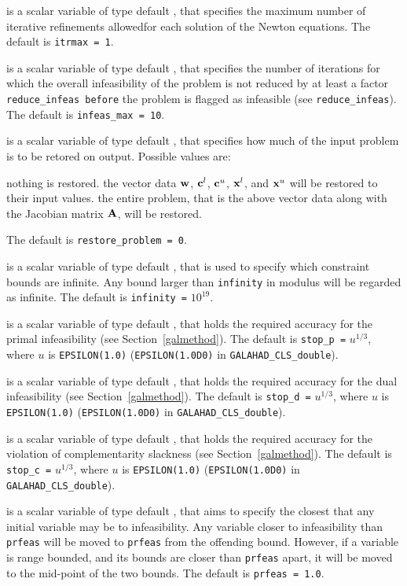 \documentclass{galahad}
\newcommand{\libraryname}{GALAHAD}
\newcommand{\packagename}{CLS}
\newcommand{\fullpackagename}{\libraryname\_\packagename}
\begin{document}
\begin{description}
 is a scalar variable of type default \integer, that specifies
the maximum number of iterative refinements allowedfor each solution of
the Newton equations.
The default is {\tt itrmax = 1}.

 is a scalar variable of type default \integer, that specifies
the number of iterations for which the overall infeasibility
of the problem is not reduced by at least a factor {\tt reduce\_infeas
before} the problem is flagged as infeasible (see {\tt reduce\_infeas}).
The default is {\tt infeas\_max = 10}.

 is a scalar variable of type default \integer, that
specifies how much of the input problem is to be retored on output.
Possible values are:
\begin{description}
 nothing is restored.
 the vector data ${\mathbf{w}}$,
   ${\mathbf{c}}^{l}$, ${\mathbf{c}}^{u}$, ${\mathbf{x}}^{l}$, and ${\mathbf{x}}^{u}$
   will be restored to their input values.
 the entire problem, that is the above vector data along with
the Jacobian matrix ${\mathbf{A}}$, will be restored.
\end{description}
The default is {\tt restore\_problem = 0}.

 is a scalar variable of type default \realdp, that is used to
specify which constraint bounds are infinite.
Any bound larger than {\tt infinity} in modulus will be regarded as infinite.
The default is {\tt infinity =} $10^{19}$.

 is a scalar variable of type default \realdp, that holds the
required accuracy for the primal infeasibility (see Section~\ref{galmethod}).
The default is {\tt stop\_p =} $u^{1/3}$,
where $u$ is {\tt EPSILON(1.0)} ({\tt EPSILON(1.0D0)} in
{\tt \fullpackagename\_double}).

 is a scalar variable of type default
\realdp, that holds the
required accuracy for the dual infeasibility (see Section~\ref{galmethod}).
The default is {\tt stop\_d =} $u^{1/3}$,
where $u$ is {\tt EPSILON(1.0)} ({\tt EPSILON(1.0D0)} in
{\tt \fullpackagename\_double}).

 is a scalar variable of type default
\realdp, that holds the
required accuracy for the violation of complementarity slackness
(see Section~\ref{galmethod}).
The default is {\tt stop\_c =} $u^{1/3}$,
where $u$ is {\tt EPSILON(1.0)} ({\tt EPSILON(1.0D0)} in
{\tt \fullpackagename\_double}).

 is a scalar variable of type default \realdp, that aims to specify
the closest that any initial variable may be to infeasibility. Any variable
closer to infeasibility than {\tt prfeas} will be moved to {\tt prfeas}
from the offending bound. However, if a variable is range bounded, and its
bounds are closer than {\tt prfeas} apart, it will be moved to the
mid-point of the two bounds.
The default is {\tt prfeas = 1.0}.


\end{description}
\end{document}
